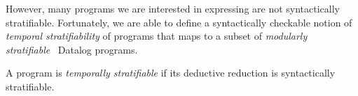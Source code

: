 However, many programs we are interested in expressing are not syntactically
stratifiable.  Fortunately, we are able to define a syntactically checkable
notion of {\em temporal stratifiability} of \slang programs that maps to a
subset of {\em modularly stratifiable}~\cite{modular} Datalog programs.



%
%

%

%
%

%
%




\begin{definition} 
%
A \slang program is \emph{temporally stratifiable} if its deductive
reduction is syntactically stratifiable.
%
\end{definition}

